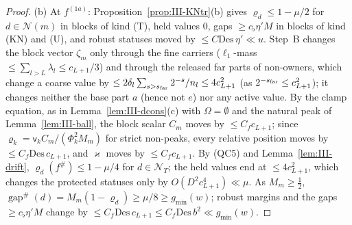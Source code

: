 \documentclass[10pt]{amsart}
\theoremstyle{definition}
\theoremstyle{remark}
\newcommand{\gap}{\operatorname{gap}}
\begin{document}
\begin{proof}
(b) At $f^{(1a)}$: Proposition~\ref{prop:III-KNtr}(b) gives $\varrho_d\le1-\mu/2$
for $d\in\mathcal N(m)$ in blocks of kind (T), held values $0$, gaps $\ge
c_\flat\eta'M$ in blocks of kind (KN) and (U), and robust statuses moved by
$\le C\mathrm{Des}\,\eta'\ll u$.  Step~B changes the block vector $\zeta_m$ only
through the fine carriers ($\ell_1$-mass $\le\sum_{l>L}\lambda_l\le c_{L+1}/3$)
and through the released far parts of non-owners, which change a coarse value
by $\le2\delta_l\sum_{s>s_{\rm far}}2^{-s}/n_l\le4c_{L+1}^2$ (as $2^{-s_{\rm far}}\le
c_{L+1}^2$); it changes neither the base part $a$ (hence not $e$) nor any
active value.  By the clamp equation, as in Lemma~\ref{lem:III-dcons}(c) with
$\Omega=\emptyset$ and the natural peak of Lemma~\ref{lem:III-ball}, the block
scalar $C_m$ moves by $\le C_fc_{L+1}$; since $\varrho_k=\mathsf v_kC_m/(\Phi_k^2M_m)$
for strict non-peaks, every relative position moves by $\le C_f\mathrm{Des}\,
c_{L+1}$, and $\varkappa$ moves by $\le C_fc_{L+1}$.  By (QC5) and
Lemma~\ref{lem:III-drift}, $\varrho_d(f^\#)\le1-\mu/4$ for $d\in\mathcal N_T$; the
held values end at $\le4c_{L+1}^2$, which changes the protected statuses only
by $O(D^2c_{L+1}^4)\ll\mu$.  As $M_m\ge\frac12$, $\gap^\#(d)=M_m(1-\varrho_d)\ge
\mu/8\ge g_{\min}(w)$; robust margins and the gaps $\ge c_\flat\eta'M$ change by
$\le C_f\mathrm{Des}\,c_{L+1}\le C_f\mathrm{Des}\,b^2\ll g_{\min}(w)$.


\end{proof}
\end{document}
